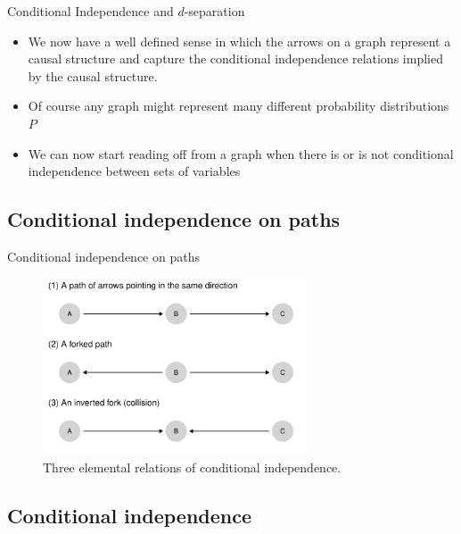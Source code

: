 \documentclass[
  11pt,
  ignorenonframetext,
]{beamer}
\begin{document}
\begin{frame}{Conditional Independence and \(d\)-separation}
\begin{itemize}
\item
  We now have a well defined sense in which the arrows on a graph
  represent a causal structure and capture the conditional independence
  relations implied by the causal structure.
\item
  Of course any graph might represent many different probability
  distributions \(P\)
\item
  We can now start reading off from a graph when there is or is not
  conditional independence between sets of variables
\end{itemize}
\end{frame}

\hypertarget{conditional-independence-on-paths}{%
\subsection{Conditional independence on
paths}\label{conditional-independence-on-paths}}

\begin{frame}{Conditional independence on paths}
\begin{figure}

{\centering \includegraphics[width=0.7\textwidth,height=\textheight]{2.1_causality_files/figure-beamer/HJ-F-2-4-1.pdf}

}

\caption{Three elemental relations of conditional independence.}

\end{figure}
\end{frame}

\hypertarget{conditional-independence-1}{%
\subsection{Conditional independence}\label{conditional-independence-1}}
\end{document}
